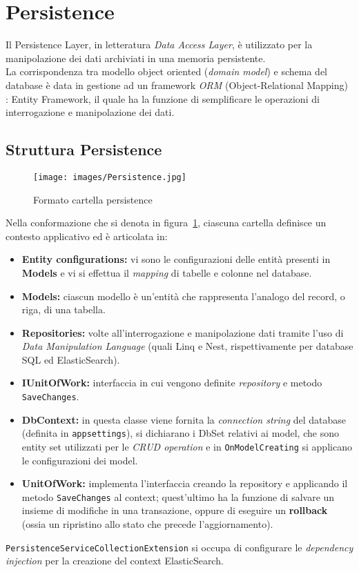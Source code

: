 \section{Persistence}
\label{chap:persistence}
Il Persistence Layer, in letteratura \textit{Data Access Layer}, è utilizzato per la manipolazione dei dati archiviati in una memoria persistente.\\
La corrispondenza tra modello object oriented (\textit{domain model}) e schema del database è data in gestione ad un framework \textit{ORM} (Object-Relational Mapping) \cite{EF}: Entity Framework, il quale ha la funzione di semplificare le operazioni di interrogazione e manipolazione dei dati.

\subsection{Struttura Persistence}
\begin{figure}[h!]
\begin{center}
  \texttt{[image: images/Persistence.jpg]}\\
  \caption{Formato cartella persistence}\label{fig:persistence}
\end{center}
\end{figure}

Nella conformazione che si denota in figura~\ref{fig:persistence}, ciascuna cartella definisce un contesto applicativo ed è articolata in:

\begin{itemize}
\item 
\textbf{Entity configurations:} vi sono le configurazioni delle entità presenti in \textbf{Models} e vi si effettua il \textit{mapping} di tabelle e colonne nel database.
\item
\textbf{Models:} ciascun modello è un'entità che rappresenta l'analogo del record, o riga, di una tabella.
\item 
\textbf{Repositories:} volte all'interrogazione e manipolazione dati tramite l'uso di \textit{Data Manipulation Language} (quali Linq e Nest, rispettivamente per database SQL ed ElasticSearch).
\item 
\textbf{IUnitOfWork:} interfaccia in cui vengono definite \textit{repository} e metodo \verb|SaveChanges|.
\item
\textbf{DbContext:} in questa classe viene fornita la \textit{connection string} del database (definita in \verb|appsettings|), si dichiarano i DbSet relativi ai model, che sono entity set utilizzati per le \textit{CRUD operation} \cite{DbSet} e in \verb|OnModelCreating| si applicano le configurazioni dei model.
\item 
\textbf{UnitOfWork:} implementa l'interfaccia creando la repository e applicando il metodo \verb|SaveChanges| al context; quest'ultimo ha la funzione di salvare un insieme di modifiche in una transazione, oppure di eseguire un \textbf{rollback} (ossia un ripristino allo stato che precede l'aggiornamento).
\end{itemize}
\verb|PersistenceServiceCollectionExtension| si occupa di configurare le \textit{dependency injection} per la creazione del context ElasticSearch.